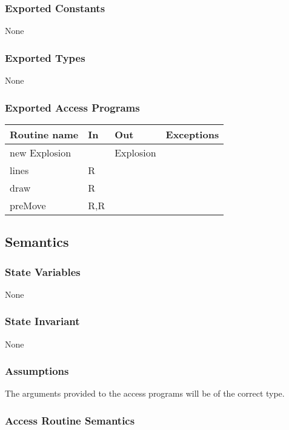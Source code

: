 \documentclass[12pt]{article}
\begin{document}
\subsubsection* {Exported Constants}

None

\subsubsection* {Exported Types}

None 

\subsubsection* {Exported Access Programs}

\begin{tabular}{| l | l | l | p{5cm} |}
\hline
\textbf{Routine name} & \textbf{In} & \textbf{Out} & \textbf{Exceptions}\\
\hline
new Explosion & ~ & Explosion  & ~\\
\hline
lines & R & ~ & ~\\
\hline
draw & R & ~  & ~\\
\hline
preMove & R,R & ~ & ~ \\
\hline
\end{tabular}

\subsection* {Semantics}

\subsubsection* {State Variables}
None


\subsubsection* {State Invariant}
None

\subsubsection* {Assumptions}

The arguments provided to the access programs will be of the correct type.

\subsubsection* {Access Routine Semantics}
\end{document}
